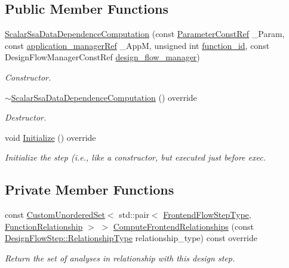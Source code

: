 \subsection*{Public Member Functions}
\begin{DoxyCompactItemize}
\item 
\hyperlink{classScalarSsaDataDependenceComputation_a8f3ca68496e20e4a19dfebc7bc2cadfb}{Scalar\+Ssa\+Data\+Dependence\+Computation} (const \hyperlink{Parameter_8hpp_a37841774a6fcb479b597fdf8955eb4ea}{Parameter\+Const\+Ref} \+\_\+\+Param, const \hyperlink{application__manager_8hpp_a04ccad4e5ee401e8934306672082c180}{application\+\_\+manager\+Ref} \+\_\+\+AppM, unsigned int \hyperlink{classFunctionFrontendFlowStep_a58ef2383ad1a212a8d3f396625a4b616}{function\+\_\+id}, const Design\+Flow\+Manager\+Const\+Ref \hyperlink{classDesignFlowStep_ab770677ddf087613add30024e16a5554}{design\+\_\+flow\+\_\+manager})
\begin{DoxyCompactList}\small\item\em Constructor. \end{DoxyCompactList}\item 
\hyperlink{classScalarSsaDataDependenceComputation_a56965ec861125f8789af1ac7d07c5b71}{$\sim$\+Scalar\+Ssa\+Data\+Dependence\+Computation} () override
\begin{DoxyCompactList}\small\item\em Destructor. \end{DoxyCompactList}\item 
void \hyperlink{classScalarSsaDataDependenceComputation_a16de581136910ae27dca6599125d3067}{Initialize} () override
\begin{DoxyCompactList}\small\item\em Initialize the step (i.\+e., like a constructor, but executed just before exec. \end{DoxyCompactList}\end{DoxyCompactItemize}
\subsection*{Private Member Functions}
\begin{DoxyCompactItemize}
\item 
const \hyperlink{classCustomUnorderedSet}{Custom\+Unordered\+Set}$<$ std\+::pair$<$ \hyperlink{frontend__flow__step_8hpp_afeb3716c693d2b2e4ed3e6d04c3b63bb}{Frontend\+Flow\+Step\+Type}, \hyperlink{classFrontendFlowStep_af7cf30f2023e5b99e637dc2058289ab0}{Function\+Relationship} $>$ $>$ \hyperlink{classScalarSsaDataDependenceComputation_ae75e90ee000e2b54738bb650d51ee07b}{Compute\+Frontend\+Relationships} (const \hyperlink{classDesignFlowStep_a723a3baf19ff2ceb77bc13e099d0b1b7}{Design\+Flow\+Step\+::\+Relationship\+Type} relationship\+\_\+type) const override
\begin{DoxyCompactList}\small\item\em Return the set of analyses in relationship with this design step. \end{DoxyCompactList}\end{DoxyCompactItemize}
